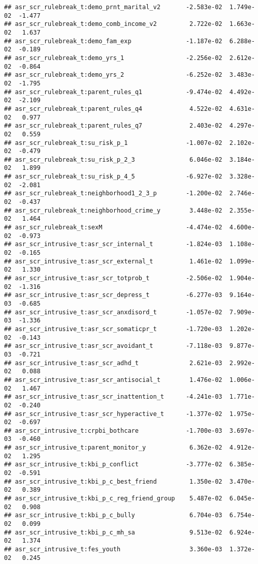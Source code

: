 \documentclass[
]{article}
\begin{document}
\begin{verbatim}
## asr_scr_rulebreak_t:demo_prnt_marital_v2       -2.583e-02  1.749e-02  -1.477
## asr_scr_rulebreak_t:demo_comb_income_v2         2.722e-02  1.663e-02   1.637
## asr_scr_rulebreak_t:demo_fam_exp               -1.187e-02  6.288e-02  -0.189
## asr_scr_rulebreak_t:demo_yrs_1                 -2.256e-02  2.612e-02  -0.864
## asr_scr_rulebreak_t:demo_yrs_2                 -6.252e-02  3.483e-02  -1.795
## asr_scr_rulebreak_t:parent_rules_q1            -9.474e-02  4.492e-02  -2.109
## asr_scr_rulebreak_t:parent_rules_q4             4.522e-02  4.631e-02   0.977
## asr_scr_rulebreak_t:parent_rules_q7             2.403e-02  4.297e-02   0.559
## asr_scr_rulebreak_t:su_risk_p_1                -1.007e-02  2.102e-02  -0.479
## asr_scr_rulebreak_t:su_risk_p_2_3               6.046e-02  3.184e-02   1.899
## asr_scr_rulebreak_t:su_risk_p_4_5              -6.927e-02  3.328e-02  -2.081
## asr_scr_rulebreak_t:neighborhood1_2_3_p        -1.200e-02  2.746e-02  -0.437
## asr_scr_rulebreak_t:neighborhood_crime_y        3.448e-02  2.355e-02   1.464
## asr_scr_rulebreak_t:sexM                       -4.474e-02  4.600e-02  -0.973
## asr_scr_intrusive_t:asr_scr_internal_t         -1.824e-03  1.108e-02  -0.165
## asr_scr_intrusive_t:asr_scr_external_t          1.461e-02  1.099e-02   1.330
## asr_scr_intrusive_t:asr_scr_totprob_t          -2.506e-02  1.904e-02  -1.316
## asr_scr_intrusive_t:asr_scr_depress_t          -6.277e-03  9.164e-03  -0.685
## asr_scr_intrusive_t:asr_scr_anxdisord_t        -1.057e-02  7.909e-03  -1.336
## asr_scr_intrusive_t:asr_scr_somaticpr_t        -1.720e-03  1.202e-02  -0.143
## asr_scr_intrusive_t:asr_scr_avoidant_t         -7.118e-03  9.877e-03  -0.721
## asr_scr_intrusive_t:asr_scr_adhd_t              2.621e-03  2.992e-02   0.088
## asr_scr_intrusive_t:asr_scr_antisocial_t        1.476e-02  1.006e-02   1.467
## asr_scr_intrusive_t:asr_scr_inattention_t      -4.241e-03  1.771e-02  -0.240
## asr_scr_intrusive_t:asr_scr_hyperactive_t      -1.377e-02  1.975e-02  -0.697
## asr_scr_intrusive_t:crpbi_bothcare             -1.700e-03  3.697e-03  -0.460
## asr_scr_intrusive_t:parent_monitor_y            6.362e-02  4.912e-02   1.295
## asr_scr_intrusive_t:kbi_p_conflict             -3.777e-02  6.385e-02  -0.591
## asr_scr_intrusive_t:kbi_p_c_best_friend         1.350e-02  3.470e-02   0.389
## asr_scr_intrusive_t:kbi_p_c_reg_friend_group    5.487e-02  6.045e-02   0.908
## asr_scr_intrusive_t:kbi_p_c_bully               6.704e-03  6.754e-02   0.099
## asr_scr_intrusive_t:kbi_p_c_mh_sa               9.513e-02  6.924e-02   1.374
## asr_scr_intrusive_t:fes_youth                   3.360e-03  1.372e-02   0.245

\end{verbatim}
\end{document}
